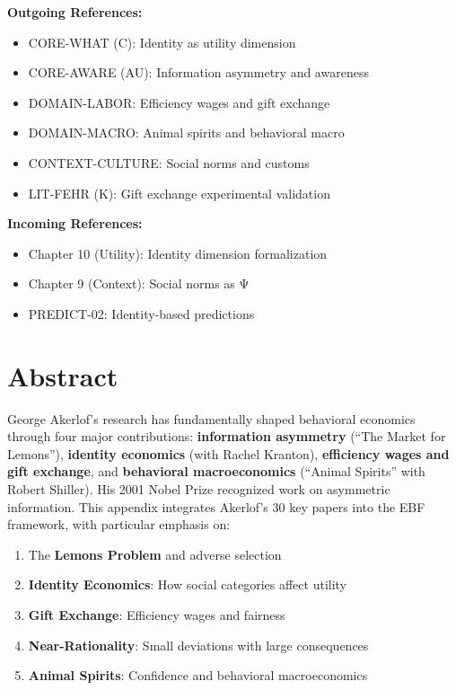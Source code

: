 \begin{tcolorbox}[colback=green!5!white, colframe=green!75!black, title=Cross-Reference Map]
\textbf{Outgoing References:}
\begin{itemize}[nosep]
    \item CORE-WHAT (C): Identity as utility dimension
    \item CORE-AWARE (AU): Information asymmetry and awareness
    \item DOMAIN-LABOR: Efficiency wages and gift exchange
    \item DOMAIN-MACRO: Animal spirits and behavioral macro
    \item CONTEXT-CULTURE: Social norms and customs
    \item LIT-FEHR (K): Gift exchange experimental validation
\end{itemize}

\textbf{Incoming References:}
\begin{itemize}[nosep]
    \item Chapter 10 (Utility): Identity dimension formalization
    \item Chapter 9 (Context): Social norms as Ψ
    \item PREDICT-02: Identity-based predictions
\end{itemize}
\end{tcolorbox}

\section*{Abstract}

George Akerlof's research has fundamentally shaped behavioral economics through four major contributions: \textbf{information asymmetry} (``The Market for Lemons''), \textbf{identity economics} (with Rachel Kranton), \textbf{efficiency wages and gift exchange}, and \textbf{behavioral macroeconomics} (``Animal Spirits'' with Robert Shiller). His 2001 Nobel Prize recognized work on asymmetric information. This appendix integrates Akerlof's 30 key papers into the EBF framework, with particular emphasis on:
\begin{enumerate}
    \item The \textbf{Lemons Problem} and adverse selection
    \item \textbf{Identity Economics}: How social categories affect utility
    \item \textbf{Gift Exchange}: Efficiency wages and fairness
    \item \textbf{Near-Rationality}: Small deviations with large consequences
    \item \textbf{Animal Spirits}: Confidence and behavioral macroeconomics
\end{enumerate}

